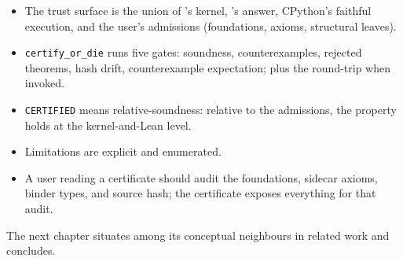 \begin{itemize}[leftmargin=1.7em]
  \item The trust surface is the union of \Lean's kernel, \Zthree's
    answer, CPython's faithful execution, and the user's
    admissions (foundations, axioms, structural leaves).
  \item \texttt{certify\_or\_die} runs five gates: soundness,
    counterexamples, rejected theorems, hash drift, counterexample
    expectation; plus the \Lean{} round-trip when invoked.
  \item \texttt{CERTIFIED} means relative-soundness: relative to
    the admissions, the property holds at the kernel-and-Lean
    level.
  \item Limitations are explicit and enumerated.
  \item A user reading a certificate should audit the foundations,
    sidecar axioms, binder types, and source hash; the certificate
    exposes everything for that audit.
\end{itemize}

The next chapter situates \Deppy{} among its conceptual neighbours
in related work and concludes.
